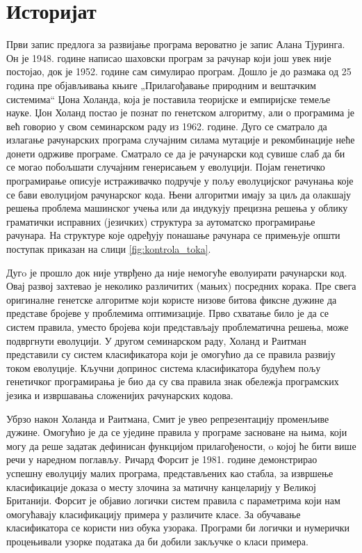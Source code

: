 \documentclass[a4paper]{article}
\begin{document}
\section{Историјат}
Први запис предлога за развијање програма вероватно је запис Алана Тјуринга. Он је 1948. године написао шаховски програм за рачунар који још увек није постојао, док је 1952. године сам симулирао програм. Дошло је до размака од 25 година пре објављивања књиге „Прилагођавање природним и вештачким системима“ Џона Холанда, која је поставила теоријске и емпиријске темеље науке.
Џон Холанд постао је познат по генетском алгоритму, али о програмима је већ говорио у свом семинарском раду из 1962. године. Дуго се сматрало да излагање рачунарских програма
случајним силама мутације и рекомбинације неће донети одрживе програме. Сматрало се да је рачунарски код сувише слаб да би се могао побољшати случајним генерисањем у еволуцији.
Појам генетичко програмирање описује истраживачко подручје у пољу еволуцијског рачунања које се бави еволуцијом рачунарског кода. Њени алгоритми имају за циљ да олакшају решења проблема машинског учења или да индукују прецизна решења у облику граматички исправних (језичких) структура за аутоматско програмирање рачунара. На структуре које одређују понашање рачунара се примењује општи поступак приказан на слици \ref{fig:kontrola_toka}.


Дугo је прошло док није утврђено  да није немогуће еволуирати рачунарски код. Овај развој захтевао је неколико различитих (мањих) посредних корака. Пре свега оригиналне генетске алгоритме који користе низове битова фиксне дужине да представе бројеве у проблемима оптимизације. Прво схватање било је да се систем правила, уместо бројева који представљају проблематична решења, може подвргнути еволуцији. У другом семинарском раду, Холанд и Раитман представили су систем класификатора који је омогућио да се правила развију током еволуције. Кључни допринос система класификатора будућем пољу генетичког програмирања је био да су сва правила знак обележја програмских језика и извршавања сложенијих рачунарских кодова.


Убрзо након Холанда и Раитмана, Смит је увео репрезентацију променљиве дужине.  Омогућио је да се уједине правила у програме засноване на њима, који могу да реше задатак дефинисан функцијом прилагођености, o којој ће бити више речи у наредном поглављу. Ричард Форсит је 1981. године демонстрирао успешну еволуцију малих програма, представљених као стабла, за извршење класификације доказа о месту злочина за матичну канцеларију у Великој Британији. Форсит је објавио логички систем правила с параметрима који нам омогућавају класификацију примера у различите класе. За обучавање класификатора се користи низ обука узорака. Програми би логички и нумерички процењивали узорке података да би добили закључке о класи примера.
\end{document}
